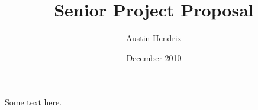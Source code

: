 \documentclass[a4paper,12pt]{report}
\begin{document}
\title{Senior Project Proposal}
\author{Austin Hendrix}
\date{December 2010}
\maketitle

Some text here.
\end{document}
